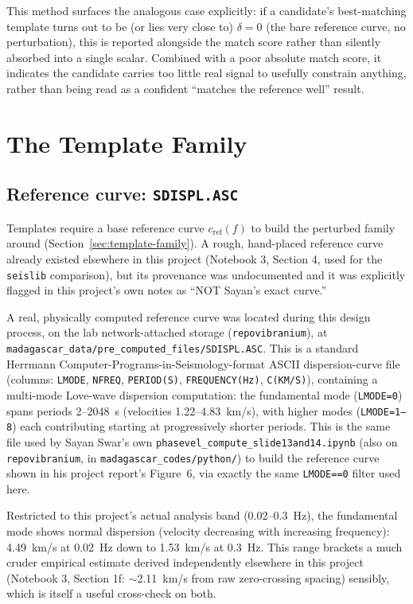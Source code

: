 \documentclass[11pt]{article}
\begin{document}
This method surfaces the analogous case explicitly: if a candidate's best-matching template turns
out to be (or lies very close to) $\delta = 0$ (the bare reference curve, no perturbation), this
is reported alongside the match score rather than silently absorbed into a single scalar. Combined
with a poor absolute match score, it indicates the candidate carries too little real signal to
usefully constrain anything, rather than being read as a confident ``matches the reference well''
result.

\section{The Template Family}
\label{sec:refcurve}

\subsection{Reference curve: \texttt{SDISPL.ASC}}

Templates require a base reference curve $c_{\text{ref}}(f)$ to build the perturbed family around
(Section~\ref{sec:template-family}). A rough, hand-placed reference curve already existed
elsewhere in this project (Notebook 3, Section 4, used for the \texttt{seislib} comparison), but
its provenance was undocumented and it was explicitly flagged in this project's own notes as ``NOT
Sayan's exact curve.''

A real, physically computed reference curve was located during this design process, on the lab
network-attached storage (\texttt{repovibranium}), at
\texttt{madagascar\_data/pre\_computed\_files/SDISPL.ASC}. This is a standard Herrmann
Computer-Programs-in-Seismology-format ASCII dispersion-curve file (columns: \texttt{LMODE},
\texttt{NFREQ}, \texttt{PERIOD(S)}, \texttt{FREQUENCY(Hz)}, \texttt{C(KM/S)}), containing a
multi-mode Love-wave dispersion computation: the fundamental mode (\texttt{LMODE=0}) spans periods
2--2048~s (velocities 1.22--4.83~km/s), with higher modes (\texttt{LMODE=1--8}) each contributing
starting at progressively shorter periods. This is the same file used by Sayan Swar's own
\texttt{phasevel\_compute\_slide13and14.ipynb} (also on \texttt{repovibranium}, in
\texttt{madagascar\_codes/python/}) to build the reference curve shown in his project report's
Figure~6, via exactly the same \texttt{LMODE==0} filter used here.

Restricted to this project's actual analysis band (0.02--0.3~Hz), the fundamental mode shows
normal dispersion (velocity decreasing with increasing frequency): 4.49~km/s at 0.02~Hz down to
1.53~km/s at 0.3~Hz. This range brackets a much cruder empirical estimate derived independently
elsewhere in this project (Notebook 3, Section 1f: $\sim$2.11~km/s from raw zero-crossing
spacing) sensibly, which is itself a useful cross-check on both.
\end{document}
